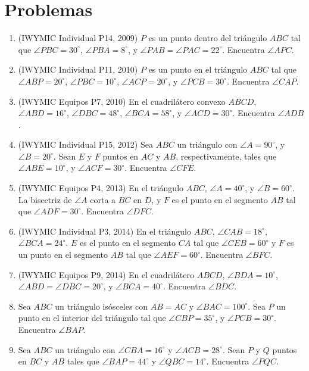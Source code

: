 \documentclass[11pt]{scrartcl}
\begin{document}
\section{Problemas}

    \begin{enumerate}
        \item (IWYMIC Individual P14, 2009) $P$ es un punto dentro del triángulo $ABC$ tal que $\angle PBC = 30^{\circ}$, $\angle PBA = 8^{\circ}$, y $\angle PAB = \angle PAC = 22^{\circ}$. Encuentra $\angle APC$.
        \item (IWYMIC Individual P11, 2010) $P$ es un punto en el triángulo $ABC$ tal que $\angle ABP = 20^{\circ}$, $\angle PBC = 10^{\circ}$, $\angle ACP = 20^{\circ}$, y $\angle PCB = 30^{\circ}$. Encuentra $\angle CAP$.
        \item (IWYMIC Equipos P7, 2010) En el cuadrilátero convexo $ABCD$, $\angle ABD = 16^{\circ}$, $\angle DBC = 48^{\circ}$, $\angle BCA = 58^{\circ}$, y $\angle ACD = 30^{\circ}$. Encuentra $\angle ADB$.
        \item (IWYMIC Individual P15, 2012) Sea $ABC$ un triángulo con $\angle A = 90 ^{\circ}$, y $\angle B = 20^{\circ}$. Sean $E$ y $F$ puntos en $AC$ y $AB$, respectivamente, tales que $\angle ABE = 10^{\circ}$, y $\angle ACF = 30^{\circ}$. Encuentra $\angle CFE$.
        \item (IWYMIC Equipos P4, 2013) En el triángulo $ABC$, $\angle A = 40^{\circ}$, y $\angle B = 60^{\circ}$. La bisectriz de $\angle A$ corta a $BC$ en $D$, y $F$ es el punto en el segmento $AB$ tal que $\angle ADF  = 30^{\circ}$. Encuentra $\angle DFC$.
        \item (IWYMIC Individual P3, 2014) En el triángulo $ABC$, $\angle CAB = 18^{\circ}$, $\angle BCA = 24 ^{\circ}$. $E$ es el punto en el segmento $CA$ tal que $\angle CEB = 60^{\circ}$ y $F$ es un punto en el segmento $AB$ tal que $\angle AEF = 60^{\circ}$. Encuentra $\angle BFC$.
        \item (IWYMIC Equipos P9, 2014) En el cuadrilátero $ABCD$, $\angle BDA = 10^{\circ}$, $\angle ABD = \angle DBC = 20^{\circ}$, y $\angle BCA = 40^{\circ}$. Encuentra $\angle BDC$.
        \item Sea $ABC$ un triángulo isósceles con $AB=AC$ y $\angle BAC = 100^{\circ}$. Sea $P$ un punto en el interior del triángulo tal que $\angle CBP = 35^{\circ}$, y $\angle PCB = 30^{\circ}$. Encuentra $\angle BAP$.
        \item Sea $ABC$ un triángulo con $\angle CBA = 16^{\circ}$ y $\angle ACB = 28^{\circ}$. Sean $P$ y $Q$ puntos en $BC$ y $AB$ tales que $\angle BAP = 44^{\circ}$ y $\angle QBC = 14^{\circ}$. Encuentra $\angle PQC$.
    \end{enumerate}
\end{document}
